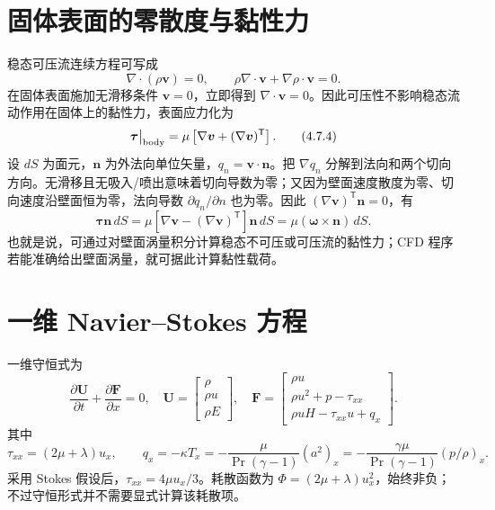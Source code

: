 \documentclass[11pt,a4paper,openany,fontset=none]{ctexbook}
\begin{document}
\section{固体表面的零散度与黏性力}

稳态可压流连续方程可写成
\begin{equation}
 \nabla\cdot(\rho\bm v)=0,
 \qquad \rho\nabla\cdot\bm v+\nabla\rho\cdot\bm v=0. \tag{4.7.1--4.7.2}
\end{equation}
在固体表面施加无滑移条件 $\bm v=0$，立即得到 $\nabla\cdot\bm v=0$。因此可压性不影响稳态流动作用在固体上的黏性力，表面应力化为
\begin{equation}
 \bm\tau\big|_{\rm body}=\mu\left[\nabla\bm v+(\nabla\bm v)^{\mathsf T}\right]. \tag{4.7.4}
\end{equation}
设 $dS$ 为面元，$\bm n$ 为外法向单位矢量，$q_n=\bm v\cdot\bm n$。把 $\nabla q_n$ 分解到法向和两个切向方向。无滑移且无吸入/喷出意味着切向导数为零；又因为壁面速度散度为零、切向速度沿壁面恒为零，法向导数 $\partial q_n/\partial n$ 也为零。因此 $(\nabla\bm v)^{\mathsf T}\bm n=0$，有
\begin{equation}
 \bm\tau\bm n\,dS
 =\mu\left[\nabla\bm v-(\nabla\bm v)^{\mathsf T}\right]\bm n\,dS
 =\mu(\bm\omega\times\bm n)\,dS. \tag{4.7.13--4.7.14}
\end{equation}
也就是说，可通过对壁面涡量积分计算稳态不可压或可压流的黏性力；CFD 程序若能准确给出壁面涡量，就可据此计算黏性载荷。

\section{一维 Navier--Stokes 方程}

一维守恒式为
\begin{equation}
 \frac{\partial\bm U}{\partial t}+\frac{\partial\bm F}{\partial x}=0,
 \quad
 \bm U=\begin{bmatrix}\rho\\\rho u\\\rho E\end{bmatrix},\quad
 \bm F=\begin{bmatrix}\rho u\\\rho u^2+p-\tau_{xx}\\\rho uH-\tau_{xx}u+q_x\end{bmatrix}. \tag{4.8.1--4.8.2}
\end{equation}
其中
\begin{equation}
 \tau_{xx}=(2\mu+\lambda)u_x,\qquad
 q_x=-\kappa T_x=-\frac{\mu}{\Pr(\gamma-1)}(a^2)_x
 =-\frac{\gamma\mu}{\Pr(\gamma-1)}(p/\rho)_x. \tag{4.8.3--4.8.4}
\end{equation}
采用 Stokes 假设后，$\tau_{xx}=4\mu u_x/3$。耗散函数为 $\Phi=(2\mu+\lambda)u_x^2$，始终非负；不过守恒形式并不需要显式计算该耗散项。
\end{document}
